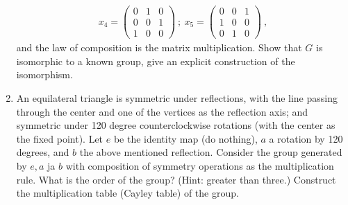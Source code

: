 \documentclass[12pt]{article}
\begin{document}
\begin{enumerate}
\begin{eqnarray*}
x_4 = \left( \begin{array}{ccc} 0 & 1 & 0 \\ 0 & 0 & 1 \\ 1 & 0 & 0
\end{array}\right) \ ; \
x_5 = \left( \begin{array}{ccc} 0 & 0 & 1 \\ 1 & 0 & 0 \\ 0 & 1 & 0
\end{array}\right) \ ,
\end{eqnarray*}
and the law of composition is the matrix multiplication.
Show that $G$ is isomorphic to a known group, give an explicit
construction of the isomorphism.
\item An equilateral triangle is symmetric under reflections, with
the line passing through the center and one of the vertices as the
reflection axis; and symmetric under 120 degree counterclockwise rotations
(with the center as the fixed point). Let $e$ be the identity
map (do nothing), $a$ a rotation by 120 degrees, and $b$ the above
mentioned reflection. Consider the group generated by
$e,a$ ja $b$ with composition of symmetry operations as the multiplication
rule.
What is the order of the group? (Hint: greater than three.)
Construct the multiplication table (Cayley table) of the group.
\end{enumerate}
\end{document}
